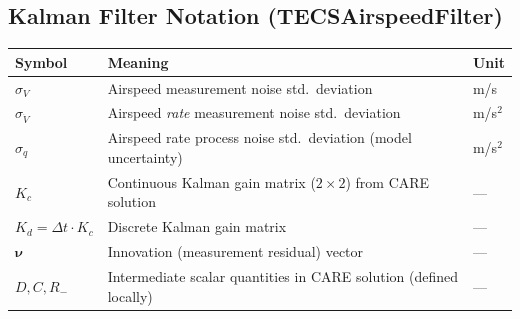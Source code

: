 \documentclass[12pt,a4paper]{article}
\begin{document}
\subsection*{Kalman Filter Notation (TECSAirspeedFilter)}
\begin{center}\begin{tabular}{lll}\toprule
Symbol & Meaning & Unit \\\midrule
$\sigma_V$ & Airspeed measurement noise std.\ deviation & m/s \\
$\sigma_{\dot{V}}$ & Airspeed \emph{rate} measurement noise std.\ deviation & m/s$^2$ \\
$\sigma_q$ & Airspeed rate process noise std.\ deviation (model uncertainty) & m/s$^2$ \\
$K_c$ & Continuous Kalman gain matrix ($2\!\times\!2$) from CARE solution & --- \\
$K_d = \Delta t\cdot K_c$ & Discrete Kalman gain matrix & --- \\
$\boldsymbol{\nu}$ & Innovation (measurement residual) vector & --- \\
$D, C, R_-$ & Intermediate scalar quantities in CARE solution (defined locally) & --- \\
\bottomrule\end{tabular}\end{center}
\end{document}
